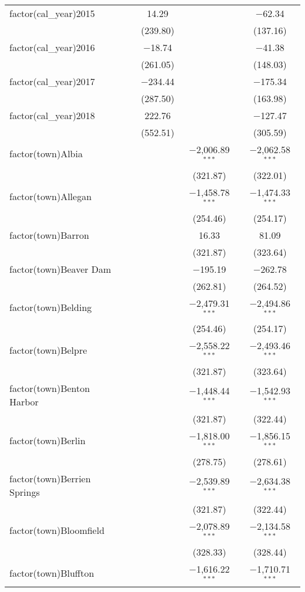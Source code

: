 \begin{table}[!htbp]
\begin{tabular}{@{\extracolsep{5pt}}lcccc}
  factor(cal\_year)2015 &  & 14.29 &  & $-$62.34 \\ 
  &  & (239.80) &  & (137.16) \\ 
  factor(cal\_year)2016 &  & $-$18.74 &  & $-$41.38 \\ 
  &  & (261.05) &  & (148.03) \\ 
  factor(cal\_year)2017 &  & $-$234.44 &  & $-$175.34 \\ 
  &  & (287.50) &  & (163.98) \\ 
  factor(cal\_year)2018 &  & 222.76 &  & $-$127.47 \\ 
  &  & (552.51) &  & (305.59) \\ 
  factor(town)Albia &  &  & $-$2,006.89$^{***}$ & $-$2,062.58$^{***}$ \\ 
  &  &  & (321.87) & (322.01) \\ 
  factor(town)Allegan &  &  & $-$1,458.78$^{***}$ & $-$1,474.33$^{***}$ \\ 
  &  &  & (254.46) & (254.17) \\ 
  factor(town)Barron &  &  & 16.33 & 81.09 \\ 
  &  &  & (321.87) & (323.64) \\ 
  factor(town)Beaver Dam &  &  & $-$195.19 & $-$262.78 \\ 
  &  &  & (262.81) & (264.52) \\ 
  factor(town)Belding &  &  & $-$2,479.31$^{***}$ & $-$2,494.86$^{***}$ \\ 
  &  &  & (254.46) & (254.17) \\ 
  factor(town)Belpre &  &  & $-$2,558.22$^{***}$ & $-$2,493.46$^{***}$ \\ 
  &  &  & (321.87) & (323.64) \\ 
  factor(town)Benton Harbor &  &  & $-$1,448.44$^{***}$ & $-$1,542.93$^{***}$ \\ 
  &  &  & (321.87) & (322.44) \\ 
  factor(town)Berlin &  &  & $-$1,818.00$^{***}$ & $-$1,856.15$^{***}$ \\ 
  &  &  & (278.75) & (278.61) \\ 
  factor(town)Berrien Springs &  &  & $-$2,539.89$^{***}$ & $-$2,634.38$^{***}$ \\ 
  &  &  & (321.87) & (322.44) \\ 
  factor(town)Bloomfield &  &  & $-$2,078.89$^{***}$ & $-$2,134.58$^{***}$ \\ 
  &  &  & (328.33) & (328.44) \\ 
  factor(town)Bluffton &  &  & $-$1,616.22$^{***}$ & $-$1,710.71$^{***}$ \\ 

\end{tabular}
\end{table}

